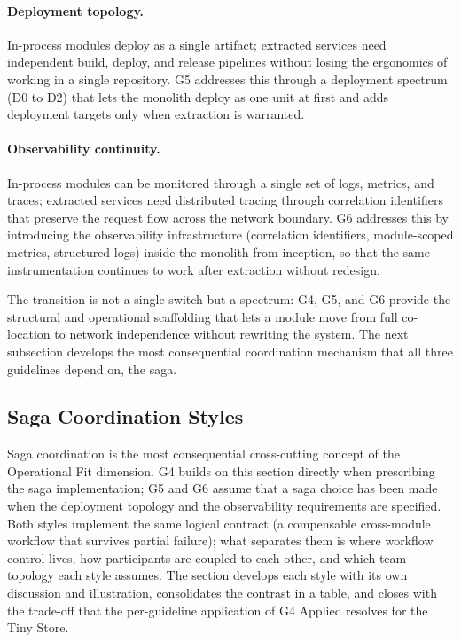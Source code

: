 \paragraph*{Deployment topology.} In-process modules deploy as a single artifact; extracted services need independent build, deploy, and release pipelines without losing the ergonomics of working in a single repository. G5 addresses this through a deployment spectrum (D0 to D2) that lets the monolith deploy as one unit at first and adds deployment targets only when extraction is warranted.

\paragraph*{Observability continuity.} In-process modules can be monitored through a single set of logs, metrics, and traces; extracted services need distributed tracing through correlation identifiers that preserve the request flow across the network boundary. G6 addresses this by introducing the observability infrastructure (correlation identifiers, module-scoped metrics, structured logs) inside the monolith from inception, so that the same instrumentation continues to work after extraction without redesign.

The transition is not a single switch but a spectrum: G4, G5, and G6 provide the structural and operational scaffolding that lets a module move from full co-location to network independence without rewriting the system. The next subsection develops the most consequential coordination mechanism that all three guidelines depend on, the saga.

\subsection*{Saga Coordination Styles}
\label{sec:g4-saga-styles}

Saga coordination is the most consequential cross-cutting concept of the Operational Fit dimension. G4 builds on this section directly when prescribing the saga implementation; G5 and G6 assume that a saga choice has been made when the deployment topology and the observability requirements are specified. Both styles implement the same logical contract (a compensable cross-module workflow that survives partial failure); what separates them is where workflow control lives, how participants are coupled to each other, and which team topology each style assumes. The section develops each style with its own discussion and illustration, consolidates the contrast in a table, and closes with the trade-off that the per-guideline application of G4 Applied resolves for the Tiny Store.

